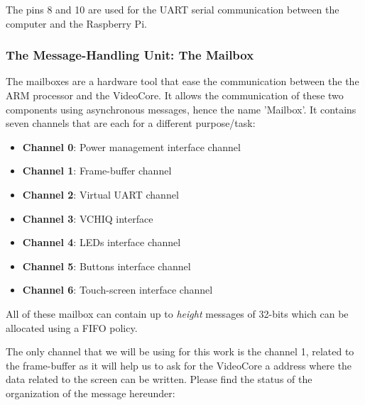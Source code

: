 The pins 8 and 10 are used for the UART serial communication between the computer and the Raspberry Pi.

\subsubsection{The Message-Handling Unit: The Mailbox}

The mailboxes\cite{mailbox} are a hardware tool that ease the communication between the the ARM processor and the VideoCore. It allows the communication of these two components using asynchronous messages, hence the name 'Mailbox'. It contains seven channels that are each for a different purpose/task:
\begin{itemize}
	\item\textbf{Channel 0}: Power management interface channel
	\item\textbf{Channel 1}: Frame-buffer channel
	\item\textbf{Channel 2}: Virtual UART channel
	\item\textbf{Channel 3}: VCHIQ interface
	\item\textbf{Channel 4}: LEDs interface channel
	\item\textbf{Channel 5}: Buttons interface channel
	\item\textbf{Channel 6}: Touch-screen interface channel
\end{itemize}

All of these mailbox can contain up to \textit{height} messages of 32-bits which can be allocated using a FIFO policy.

The only channel that we will be using for this work is the channel 1, related to the frame-buffer as it will help us to ask for the VideoCore a address where the data related to the screen can be written. Please find the status of the organization of the message hereunder:

